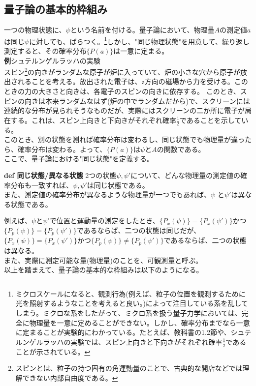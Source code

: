\documentclass[a4paper,11pt]{jsarticle}
\begin{document}
\subsection{量子論の基本的枠組み}
一つの物理状態に、$\psi$という名前を付ける。量子論において、物理量$A$の測定値$a$は同じ$\psi$に対しても、ばらつく。\footnote{ミクロスケールになると、観測行為(例えば、粒子の位置を観測するために光を照射するようなことを考えると良い。)によって注目している系を乱してしまう。ミクロな系をしたがって、ミクロ系を扱う量子力学においては、完全に物理量を一意に定めることができない。しかし、確率分布までなら一意に定まることが実験的にわかっている。たとえば、教科書の1.2節や、シュテルンゲルラッハの実験では、スピン上向きと下向きがそれぞれ確率$\frac{1}{2}$であることが示されている。}しかし、"同じ物理状態"を用意して、繰り返し測定すると、その確率分布$\{P(a)\}$は一意に定まる。\\

\textbf{例}シュテルンゲルラッハの実験\\
スピン\footnote{スピンとは、粒子の持つ固有の角運動量のことで、古典的な開店などでは理解できない内部自由度である。}の向きがランダムな原子が炉に入っていて、炉の小さな穴から原子が放出されることを考える。放出された電子は、z方向の磁場から力を受ける。このときの力の大きさと向きは、各電子のスピンの向きに依存する。
このとき、スピンの向きは本来ランダムなはず(炉の中でランダムだから)で、スクリーンには連続的な分布が見られそうなものだが、実際にはスクリーンの二か所に電子が局在する。これは、スピン上向きと下向きがそれぞれ確率$\frac{1}{2}$であることを示している。\\

このとき、別の状態を測れば確率分布は変わるし、同じ状態でも物理量が違ったら、確率分布は変わる。よって、$\{P(a)\}$は$\psi$と$A$の関数である。\\

ここで、量子論における"同じ状態"を定義する。\\

\begin{itembox}[l]{\textbf {def 同じ状態/異なる状態}}
2つの状態$\psi ,\psi '$について、どんな物理量の測定値の確率分布も一致すれば、$\psi ,\psi '$は同じ状態である。\\
また、測定値の確率分布が異なるような物理量が一つでもあれば、$\psi$ と$\psi '$は異なる状態である。\\
\end{itembox}
例えば、$\psi$と$\psi '$で位置と運動量の測定をしたとき、$\{P_x(\psi)\}=\{P_x(\psi ')\}$かつ$\{P_p(\psi)\}=\{P_p(\psi ')\}$であるならば、二つの状態は同じだが、$\{P_x(\psi)\}=\{P_x(\psi ')\}$かつ$\{P_p(\psi)\}\neq \{P_p(\psi ')\}$であるならば、二つの状態は異なる。\\
また、実際に測定可能な量(物理量)のことを、可観測量と呼ぶ。\\
以上を踏まえて、量子論の基本的な枠組みは以下のようになる。\\
\end{document}
